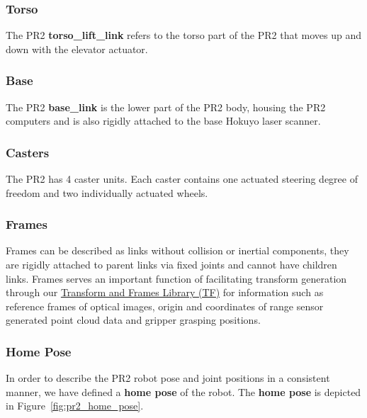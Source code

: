 \subsubsection{Torso}
The PR2 {\bf torso\_lift\_link} refers to the torso part of the PR2 that moves up and down with the elevator actuator.

\subsubsection{Base}
The PR2 {\bf base\_link} is the lower part of the PR2 body, housing the PR2 computers and is also rigidly attached to the base Hokuyo laser scanner.

\subsubsection{Casters}
The PR2 has 4 caster units.  Each caster contains one actuated steering degree of freedom and two individually actuated wheels.

\subsubsection{Frames}
Frames can be described as links without collision or inertial components, they are rigidly attached to parent links via fixed joints and cannot have children links.
Frames serves an important function of facilitating transform generation through our \href{http://www.ros.org/wiki/tf}{Transform and Frames Library (TF)} for information such as
reference frames of optical images, origin and coordinates of range sensor generated point cloud data and gripper grasping positions.

\subsubsection{Home Pose}
In order to describe the PR2 robot pose and joint positions in a consistent manner, we have defined a {\bf home pose} of the robot.  The {\bf home pose} is depicted in Figure~\ref{fig:pr2_home_pose}.

